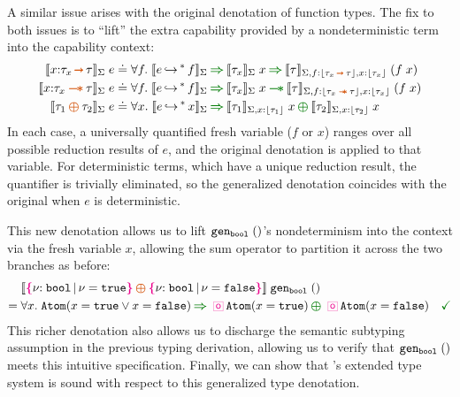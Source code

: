 A similar issue arises with the original denotation of function
types. The fix to both issues is to ``lift'' the extra capability
provided by a nondeterministic term into the capability context:
\vspace{-0.2em}
\begin{align*}
  \denot{x{:}\tau_x \ctsarr \tau}_\Sigma\;e
    &\doteq \forall f.\; \denot{\mstep{e}{f}}_\Sigma \chimpl
             \denot{\tau_x}_\Sigma\;x \chimpl
             \denot{\tau}_{\Sigma,f{:}\eraserf{\tau_x \ctsarr \tau}, x{:}\eraserf{\tau_x}}\;(f\;x)
  \\\denot{x{:}\tau_x \ctwand \tau}_\Sigma\;e
    &\doteq \forall f.\; \denot{\mstep{e}{f}}_\Sigma \chimpl
             \denot{\tau_x}_\Sigma\;x \chwand
             \denot{\tau}_{\Sigma,f{:}\eraserf{\tau_x\ctwand \tau}, x{:}\eraserf{\tau_x}}\;(f\;x)
  \\\denot{\tau_1 \ctoplus \tau_2}_\Sigma\;e
    &\doteq \forall x.\; \denot{\mstep{e}{x}}_\Sigma \chimpl
             \denot{\tau_1}_{\Sigma,x{:}\eraserf{\tau_1}}\;x \choplus \denot{\tau_2}_{\Sigma,x{:}\eraserf{\tau_2}}\;x
\end{align*}
In each case, a universally quantified fresh variable ($f$ or $x$)
ranges over all possible reduction results of $e$, and the original
denotation is applied to that variable.  For deterministic terms,
which have a unique reduction result, the quantifier is trivially
eliminated, so the generalized denotation coincides with the original
when $e$ is deterministic.

This new denotation allows us to lift ${\tt gen_{bool} \;()}$'s
nondeterminism into the context via the fresh variable $x$, allowing
the sum operator to partition it across the two branches as before:
\vspace{-0.2em}
\begin{align*}
  &\denot{\ort{\Bool}{\vnu = \true} \ctoplus
          \ort{\Bool}{\vnu = \false}}\;\Code{gen_{bool} \;()}
  \\=\;& \forall x.\; \Code{Atom}(x = \true \lor x = \false) \chimpl
          \demonic\,\Code{Atom}(x = \true) \choplus
          \demonic\,\Code{Atom}(x = \false)
  \quad\judgok
\end{align*}
This richer denotation also allows us to discharge the semantic
subtyping assumption in the previous typing derivation, allowing us to
verify that ${\tt gen_{bool} \;()}$ meets this intuitive
specification. Finally, we can show that \langNDname{}'s extended type
system is sound with respect to this generalized type denotation.

